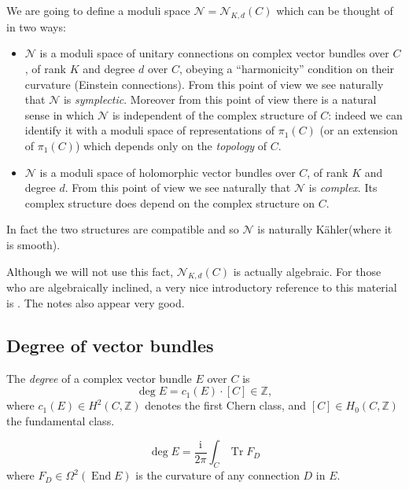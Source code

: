\documentclass[12pt,letterpaper,reqno]{article}
\numberwithin{equation}{section}
\newcommand{\cN}{\ensuremath{\mathcal N}}
\newcommand{\Z}{\ensuremath{\mathbb Z}}
\newcommand{\kahler}{K\"ahler\xspace}
\newcommand{\I}{{\mathrm i}}
\newcommand{\ti}[1]{\textit{#1}}
\DeclareMathOperator{\Tr}{Tr}
\DeclareMathOperator{\End}{End}
\begin{document}
We are going to define a moduli space $\cN = \cN_{K,d}(C)$ which can be
thought of in two ways:
\begin{itemize}
\item $\cN$ is a moduli space of unitary connections on
complex vector bundles over $C$, of
rank $K$ and degree $d$ over $C$, obeying a ``harmonicity''
condition on their curvature (Einstein connections).
From this point of view we see naturally that $\cN$ is
\ti{symplectic}. Moreover from this point of view
there is a natural sense in which $\cN$ is independent
of the complex structure of $C$: indeed we can identify
it with a moduli space of representations of $\pi_1(C)$
(or an extension of $\pi_1(C)$) which depends only
on the \ti{topology} of $C$.
\item $\cN$ is a moduli space of holomorphic vector
bundles over $C$, of rank $K$ and degree $d$.
From this point of view we see naturally that $\cN$ is
\ti{complex}. Its complex structure does depend on
the complex structure on $C$.
\end{itemize}
In fact the two structures are compatible and so
$\cN$ is naturally \kahler (where it is smooth).

Although we will not use this fact, $\cN_{K,d}(C)$ is actually
algebraic. For those who are algebraically inclined, a
very nice introductory reference to this
material is \cite{MR98b:14010}. The notes
\cite{MR2408226} also appear very good.


\subsection{Degree of vector bundles}

\begin{defn} The \ti{degree} of a
complex vector bundle $E$ over $C$ is
\begin{equation}
  \deg E = c_1(E) \cdot [C] \in \Z,
\end{equation}
where $c_1(E) \in H^2(C,\Z)$ denotes the first Chern class,
and $[C] \in H_0(C,\Z)$ the fundamental class.
\end{defn}

\begin{prop} \label{prop:chern-weil-degree}
\begin{equation}
  \deg E = \frac{\I}{2 \pi} \int_C \Tr F_D
\end{equation}
where $F_D \in \Omega^2(\End E)$ is the curvature of any
connection $D$ in $E$.
\end{prop}
\end{document}
